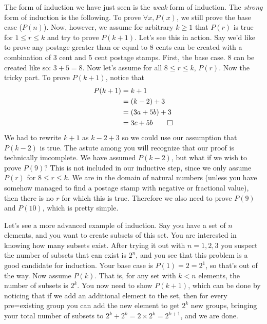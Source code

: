 \documentclass[nobib]{tufte-handout}
\begin{document}
The form of induction we have just seen is the \emph{weak} form of 
induction. The \emph{strong} form of induction is the following.
To prove $\forall x, P(x)$, we still prove the base case ($P(n)$). 
Now, however, we assume for arbitrary $k \geq 1$ that $P(r)$ is 
true for $1 \leq r \leq k$ and try to prove $P(k+1)$.
Let's see this in action. Say we'd like to prove any postage 
greater than or equal to 8 cents can be created with a combination 
of 3 cent and 5 cent postage stamps. First, the base case. 8 can be 
created like so: $3+5 = 8$. Now let's assume for all $8 \leq r \leq k$, 
$P(r)$. Now the tricky part. To prove $P(k+1)$, notice that
\begin{align*}
    P(k+1) &= k+1 \\
    &= (k-2) + 3 \\
    &= (3a+5b) + 3 \\
    &= 3c + 5b \qed
\end{align*}
We had to rewrite $k+1$ as $k-2 + 3$ so we could 
use our assumption that $P(k-2)$ is true. 
The astute among you will recognize that our proof is technically
imcomplete. We have assumed $P(k-2)$, but what if we wish to prove $P(9)$? 
This is not included in our inductive step, since we only assume $P(r)$ 
for $8\leq r \leq k$. We are in the domain of natural numbers (unless you
have somehow managed to find a postage stamp with negative or fractional value),
then there is no $r$ for which this is true. Therefore we also need to prove 
$P(9)$ and $P(10)$, which is pretty simple. 

Let's see a more advanced example 
of induction. Say you have a set of $n$ elements, and you want to create subsets of this set. 
You are interested in knowing how many subsets exist. After trying it out with 
$n=1,2,3$ you suspect the number of subsets that can exist is $2^n$, and you see
that this problem is a good candidate for induction. Your base case is 
$P(1) = 2 = 2^1$, so that's out of the way. Now assume $P(k)$. That is, for any 
set with $k < n$ elements, the number of subsets is $2^k$. You now need to show 
$P(k+1)$, which can be done by noticing that if we add an additional element to the set, 
then for every pre=existing group you can add the new element to get $2^k$ new groups, bringing your total 
number of subsets to $2^k+2^k=2\times2^k = 2^{k+1}$, and we are done.  
\end{document}
